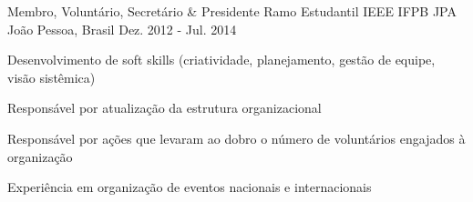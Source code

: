 \begin{cventries}
\cventry
  {Membro, Voluntário, Secretário \& Presidente} %
  {Ramo Estudantil IEEE IFPB JPA} %
  {João Pessoa, Brasil} %
  {Dez. 2012 - Jul. 2014} %
  {
    \begin{cvitems} %
      \item{Desenvolvimento de soft skills (criatividade, planejamento, gestão de equipe, visão sistêmica)}
      \item{Responsável por atualização da estrutura organizacional}
      \item{Responsável por ações que levaram ao dobro o número de voluntários engajados à organização}
      \item{Experiência em organização de eventos nacionais e internacionais}
    \end{cvitems}
  }
%
\end{cventries}
